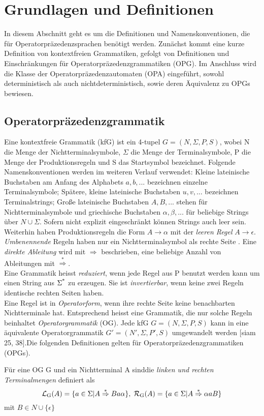 \section{Grundlagen und Definitionen}
In diesem Abschnitt geht es um die Definitionen und Namenskonventionen, die für Operatorpräzedenzsprachen benötigt werden. Zunächst kommt eine kurze Definition von kontextfreien Grammatiken, gefolgt von Definitionen und Einschränkungen für Operatorpräzedenzgrammatiken (OPG). Im Anschluss wird die Klasse der Operatorpräzedenzautomaten (OPA) eingeführt, sowohl deterministisch als auch nichtdeterministisch, sowie deren Äquivalenz zu OPGs bewiesen. 
\subsection{Operatorpräzedenzgrammatik}
Eine kontextfreie Grammatik (kfG) ist ein 4-tupel $G = (N, \Sigma, P, S)$, wobei N die Menge der Nichtterminalsymbole, $\Sigma$ die Menge der Terminalsymbole, P die Menge der Produktionsregeln und S das Startsymbol bezeichnet. Folgende Namenskonventionen werden im weiteren Verlauf verwendet: Kleine lateinische Buchstaben am Anfang des Alphabets $a, b, ...$ bezeichnen einzelne Terminalsymbole; Spätere, kleine lateinische Buchstaben $u,v, ...$ bezeichnen Terminalstrings; Große lateinische Buchstaben $A, B, ...$ stehen für Nichtterminalsymbole und griechische Buchstaben $\alpha, \beta, ...$ für beliebige Strings über $N \cup \Sigma$. Sofern nicht explizit eingeschränkt können Strings auch leer sein.\\
Weiterhin haben Produktionsregeln die Form $A \rightarrow \alpha$ mit der \textit{leeren Regel} $A \rightarrow \epsilon$. \textit{Umbenennende} Regeln haben nur ein Nichtterminalsymbol als rechte Seite . Eine \textit{direkte Ableitung} wird mit $\Rightarrow$ beschrieben, eine beliebige Anzahl von Ableitungen mit $\overset{*}{\Rightarrow}$.
\\
Eine Grammatik heisst \textit{reduziert}, wenn jede Regel aus P benutzt werden kann um einen String aus $\Sigma\textsuperscript{*}$ zu erzeugen. Sie ist \textit{invertierbar}, wenn keine zwei Regeln identische rechten Seiten haben.\\
Eine Regel ist in \textit{Operatorform}, wenn ihre rechte Seite keine benachbarten Nichtterminale hat. Entsprechend heisst eine Grammatik, die nur solche Regeln beinhaltet \textit{Operatorgrammatik} (OG). Jede kfG $G=(N,\Sigma, P, S)$ kann in eine äquivalente Operatorgrammatik $G'=(N', \Sigma, P', S)$ umgewandelt werden [siam 25, 38].Die folgenden Definitionen gelten für Operatorpräzedenzgrammatiken (OPGs). \\
\begin{definition}

Für eine OG G und ein Nichtterminal A sinddie \textit{linken und rechten Terminalmengen}  definiert als 
$$ \mathcal{L} \textsubscript{G}(A) = \{ a \in \Sigma | A \overset{*}{\Rightarrow} Ba \alpha \}, \;
 \mathcal{R} \textsubscript{G}(A) = \{ a \in \Sigma | A \overset{*}{\Rightarrow} \alpha aB \}$$
mit $B \in N \cup \{\epsilon\}$
\end{definition}

